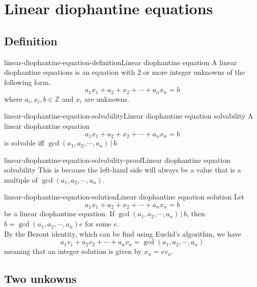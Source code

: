 \documentclass[preview]{standalone}
\newcommand{\divides}{\,|\,}
\begin{document}
\genpage

\section{Linear diophantine equations}

\subsection{Definition}

\begin{snippetdefinition}{linear-diophantine-equation-definition}{Linear diophantine equation}
    A linear diophantine equations is an equation with 2 or more integer unknowns of the following form.
    \[
        a_1x_1 + a_2+x_2 + \cdots + a_nx_n = b
    \]
    where \(a_i,x_i,b \in \mathbb{Z}\) and \(x_i\) are unknowns.
\end{snippetdefinition}

\begin{snippetproposition}{linear-diophantine-equation-solvability}{Linear diophantine equation solvability}
    A linear diophantine equation
    \[
        a_1x_1 + a_2+x_2 + \cdots + a_nx_n = b
    \]
    is solvable iff \(\gcd(a_1,a_2,\cdots,a_n) \divides b\).
\end{snippetproposition}

\begin{snippetproof}{linear-diophantine-equation-solvability-proof}{Linear diophantine equation solvability}
    This is because the left-hand side will always be a value that is a multiple
    of \(\gcd(a_1,a_2,\cdots,a_n)\).
\end{snippetproof}

\begin{snippetproposition}{linear-diophantine-equation-solution}{Linear diophantine equation solution}
    Let
    \[
        a_1x_1 + a_2+x_2 + \cdots + a_nx_n = b
    \]
    be a linear diophantine equation.
    If \(\gcd(a_1,a_2,\cdots,a_n) \divides b\),
    then \(b = \gcd(a_1,a_2,\cdots,a_n)e\) for some \(e\). \\
    By the Bezout identity, which can be find using Euclid's algorithm, we have
    \[a_1v_1+a_2v_2+\cdots+a_nv_n=\gcd(a_1,a_2,\cdots,a_n)\]
    meaning that an integer solution is given by \(x_n=ev_n\).
\end{snippetproposition}

\subsection{Two unkowns}
\end{document}
